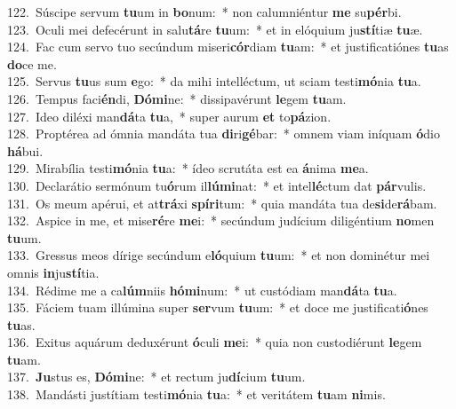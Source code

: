 {122.~}Súscipe servum \textbf{tu}um in \textbf{bo}num:~* non calumniéntur \textbf{me} su\textbf{pér}bi.\\
{123.~}Oculi mei defecérunt in salu\textbf{tá}re \textbf{tu}um:~* et in elóquium ju\textbf{stí}tiæ \textbf{tu}æ.\\
{124.~}Fac cum servo tuo secúndum miseri\textbf{cór}diam \textbf{tu}am:~* et justificatiónes \textbf{tu}as \textbf{do}ce me.\\
{125.~}Servus \textbf{tu}us sum \textbf{e}go:~* da mihi intelléctum, ut sciam testi\textbf{mó}nia \textbf{tu}a.\\
{126.~}Tempus faci\textbf{én}di, \textbf{Dó}\textbf{mi}ne:~* dissipavérunt \textbf{le}gem \textbf{tu}am.\\
{127.~}Ideo diléxi man\textbf{dá}ta \textbf{tu}a,~* super aurum \textbf{et} to\textbf{pá}zion.\\
{128.~}Proptérea ad ómnia mandáta tua \textbf{di}ri\textbf{gé}bar:~* omnem viam iníquam \textbf{ó}dio \textbf{há}bui.\\
{129.~}Mirabília testi\textbf{mó}nia \textbf{tu}a:~* ídeo scrutáta est ea \textbf{á}nima \textbf{me}a.\\
{130.~}Declarátio sermónum tu\textbf{ó}rum il\textbf{lú}\textbf{mi}nat:~* et intel\textbf{lé}ctum dat \textbf{pár}vulis.\\
{131.~}Os meum apérui, et at\textbf{trá}xi \textbf{spí}\textbf{ri}tum:~* quia mandáta tua de\textbf{si}de\textbf{rá}bam.\\
{132.~}Aspice in me, et mise\textbf{ré}re \textbf{me}i:~* secúndum judícium diligéntium \textbf{no}men \textbf{tu}um.\\
{133.~}Gressus meos dírige secúndum e\textbf{ló}quium \textbf{tu}um:~* et non dominétur mei omnis \textbf{in}ju\textbf{stí}tia.\\
{134.~}Rédime me a ca\textbf{lúm}niis \textbf{hó}\textbf{mi}num:~* ut custódiam man\textbf{dá}ta \textbf{tu}a.\\
{135.~}Fáciem tuam illúmina super \textbf{ser}vum \textbf{tu}um:~* et doce me justificati\textbf{ó}nes \textbf{tu}as.\\
{136.~}Exitus aquárum deduxérunt \textbf{ó}culi \textbf{me}i:~* quia non custodiérunt \textbf{le}gem \textbf{tu}am.\\
{137.~}\textbf{Ju}stus es, \textbf{Dó}\textbf{mi}ne:~* et rectum ju\textbf{dí}cium \textbf{tu}um.\\
{138.~}Mandásti justítiam testi\textbf{mó}nia \textbf{tu}a:~* et veritátem \textbf{tu}am \textbf{ni}mis.\\
